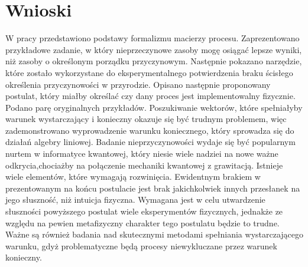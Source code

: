 \documentclass[10pt]{article} %
\begin{document}
\section{Wnioski}
W pracy przedstawiono podstawy formalizmu macierzy procesu. Zaprezentowano przykładowe zadanie, w który nieprzeczynowe zasoby mogę osiągać lepsze wyniki, niż zasoby o określonym porządku przyczynowym. Następnie pokazano narzędzie, które zostało wykorzystane do eksperymentalnego potwierdzenia
braku ścisłego określenia przyczynowości w przyrodzie. Opisano następnie proponowany postulat, który miałby określać czy dany proces jest implementowalny fizycznie. Podano parę oryginalnych przykładów. Poszukiwanie wektorów, które spełniałyby warunek wystarczający i konieczny okazuje się być trudnym problemem, więc zademonstrowano wyprowadzenie 
warunku koniecznego, który sprowadza się do działań algebry liniowej. Badanie nieprzyczynowości wydaje się być popularnym nurtem w informatyce kwantowej, który niesie wiele nadziei na nowe ważne odkrycia,chociażby na połączenie mechaniki kwantowej z grawitacją. Istnieje wiele elementów, które wymagają rozwinięcia.
Ewidentnym brakiem w prezentowanym na końcu postulacie jest brak jakichkolwiek innych przesłanek na jego słuszność, niż intuicja fizyczna. Wymagana jest w celu utwardzenie słuszności powyższego postulat wiele eksperymentów fizycznych, jednakże ze względu na pewien metafizyczny charakter tego postulatu będzie to trudne.
Ważne są również badania nad skutecznymi metodami spełniania wystarczającego warunku, gdyż problematyczne będą procesy niewykluczane przez warunek konieczny.


\newpage
\tableofcontents
\newpage
\listoffigures
\newpage



\end{document}
